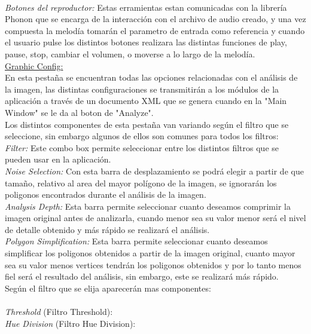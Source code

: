 \\\textit{Botones del reproductor:} Estas erramientas estan comunicadas con la librería Phonon que se encarga de la interacción con el archivo de audio creado, y una vez compuesta la melodía tomarán el parametro de entrada como referencia y cuando el usuario pulse los distintos botones realizara las distintas funciones de play, pause, stop, cambiar el volumen, o moverse a lo largo de la melodía.
\newline
\\\underline{Graphic Config:}
\\En esta pestaña se encuentran todas las opciones relacionadas con el análisis de la imagen, las distintas configuraciones se transmitirán a los módulos de la aplicación a través de un documento XML que se genera cuando en la "Main Window" se le da al boton de "Analyze".
\\Los distintos componentes de esta pestaña van variando según el filtro que se seleccione, sin embargo algunos de ellos son comunes para todos los filtros:
\newline
\\\textit{Filter:} Este combo box permite seleccionar entre los distintos filtros que se pueden usar en la aplicación.
\\\textit{Noise Selection:} Con esta barra de desplazamiento se podrá elegir a partir de que tamaño, relativo al area del mayor polígono de la imagen, se ignorarán los poligonos encontrados durante el análisis de la imagen.
\\\textit{Analysis Depth:} Esta barra permite seleccionar cuanto deseamos comprimir la imagen original antes de analizarla, cuando menor sea su valor menor será el nivel de detalle obtenido y más rápido se realizará el análisis.
\\\textit{Polygon Simplification:} Esta barra permite seleccionar cuanto deseamos simplificar los poligonos obtenidos a partir de la imagen original, cuanto mayor sea su valor menos vertices tendrán los poligonos obtenidos y por lo tanto menos fiel será el resultado del análisis, sin embargo, este se realizará más rápido.
\newline
\\Según el filtro que se elija aparecerán mas componentes:
\newline
\\
\\\textit{Threshold} (Filtro Threshold): 
\\\textit{Hue Division} (Filtro Hue Division):
